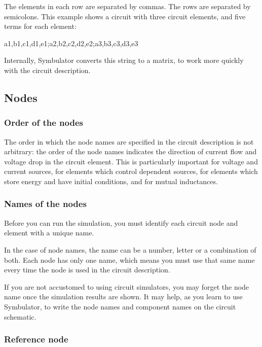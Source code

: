 The elements in each row are separated by commas. The rows are
separated by semicolons. This example shows a circuit with three
circuit elements, and five terms for each element:

\begin{entry}
a1,b1,c1,d1,e1;a2,b2,c2,d2,e2;a3,b3,c3,d3,e3
\end{entry}

Internally, Symbulator converts this string to a matrix, to work
more quickly with the circuit description.

\subsection{Nodes}

\subsubsection{Order of the nodes}

The order in which the node names are specified in the circuit
description is not arbitrary: the order of the node names indicates
the direction of current flow and voltage drop in the circuit
element. This is particularly important for voltage and current
sources, for elements which control dependent sources, for elements
which store energy and have initial conditions, and for mutual
inductances.

\subsubsection{Names of the nodes}

Before you can run the simulation, you must identify each circuit
node and element with a unique name.

In the case of node names, the name can be a number, letter or a
combination of both. Each node has only one name, which means you
must use that same name every time the node is used in the circuit
description.

If you are not accustomed to using circuit simulators, you may
forget the node name once the simulation results are shown. It may
help, as you learn to use Symbulator, to write the node names and
component names on the circuit schematic.

\subsubsection{Reference node}

